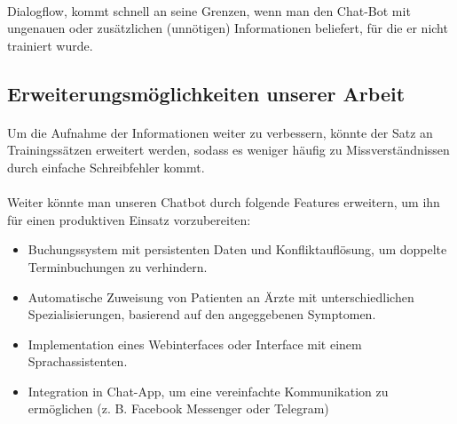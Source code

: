 \documentclass[11pt,a4paper]{article}
\begin{document}
        \paragraph{}
            Dialogflow, kommt schnell an seine Grenzen, wenn man den Chat-Bot mit ungenauen oder zusätzlichen (unnötigen) Informationen
            beliefert, für die er nicht trainiert wurde.
            
    \subsection{Erweiterungsmöglichkeiten unserer Arbeit}
        \paragraph{}
            Um die Aufnahme der Informationen weiter zu verbessern, könnte der Satz an Trainingssätzen erweitert werden, sodass es weniger
            häufig zu Missverständnissen durch einfache Schreibfehler kommt.
            
        \paragraph{}
            Weiter könnte man unseren Chatbot durch folgende Features erweitern, um ihn für einen produktiven Einsatz vorzubereiten:
            \begin{itemize}
                \item Buchungssystem mit persistenten Daten und Konfliktauflösung, um doppelte Terminbuchungen zu verhindern.
                \item Automatische Zuweisung von Patienten an Ärzte mit unterschiedlichen Spezialisierungen, basierend auf den angeggebenen
                	Symptomen.
                \item Implementation eines Webinterfaces oder Interface mit einem Sprachassistenten.
                \item Integration in Chat-App, um eine vereinfachte Kommunikation zu ermöglichen (z. B. Facebook Messenger oder Telegram)
            \end{itemize}
\end{document}
